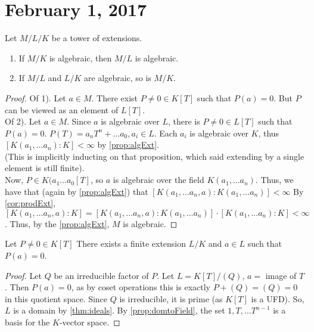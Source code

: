 \section{February 1, 2017}
\begin{prop}
    Let $M / L / K$ be a tower of extensions.
    \begin{enumerate}[1)]
        \item If $M / K$ is algebraic, then $M / L$ is algebraic.
        \item If $M / L$ and $L / K$ are algebraic, so is $M/K$.
    \end{enumerate}
\end{prop}

\begin{proof}
    Of 1). Let $a \in M$. There exist $P \neq 0 \in K[T]$ such that $P(a) = 0$. But
    $P$ can be viewed as an element of $L[T]$. \\
    Of 2). Let $a \in M$. Since $a$ is algebraic over $L$, there is $P \neq 0 \in L[T]$
    such that $P(a) = 0$. $P(T) = a_nT^n + \dots a_0, a_i \in L$. Each $a_i$ is
    algebraic over $K$, thus $[K(a_1, \dots a_n) : K] < \infty$ by \ref{prop:algExt}. \\
    (This is implicitly inducting on that proposition, which said extending by a single
    element is still finite). \\
    Now, $P \in K(a_1 \dots a_0[T]$, so $a$ is algebraic over the field $K(a_1, \dots a_n)$.
    Thus, we have that (again by \ref{prop:algExt}) that $[K(a_1, \dots a_n, a) : K(a_1, \dots a_n)] < \infty$
    By \ref{cor:prodExt}, $[K(a_1, \dots a_n, a) : K] = [K(a_1, \dots a_n, a) : K(a_1, \dots a_n)] \cdot
    [K(a_1, \dots a_n) : K] < \infty$. Thus, by the \ref{prop:algExt}, $M$ is algebraic.
\end{proof}

\begin{prop}\label{prop:rootextend}
    Let $P \neq 0 \in K[T]$ There exists a finite extension $L / K$ and $a \in L$
    such that $P(a) = 0$.
\end{prop}
\begin{proof}
    Let $Q$ be an irreducible factor of $P$. Let $L = K[T] / (Q)$, $a =$ image of $T$.
    Then $P(a) = 0$, as by coset operations this is exactly $P + (Q) = (Q) = 0$ in this
    quotient space. Since $Q$ is irreducible, it is prime (as $K[T]$ is a UFD). So,
    $L$ is a domain by \ref{thm:ideals}. By \ref{prop:domtoField}, the set $1, T, \dots T^{n-1}$ is
    a basis for the $K$-vector space.
\end{proof}

